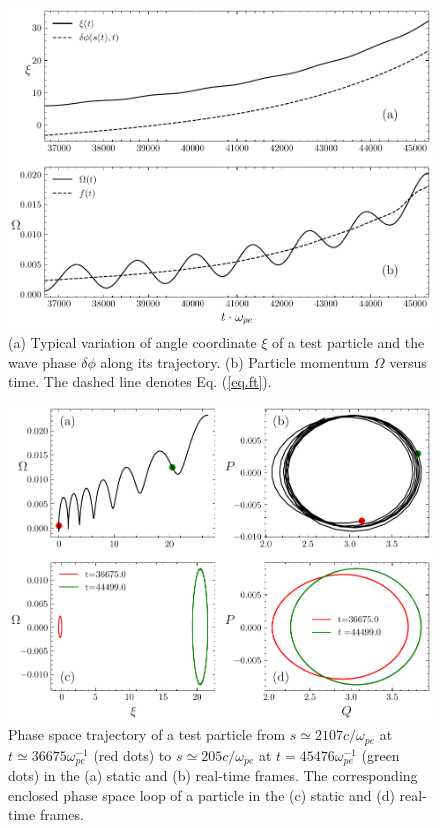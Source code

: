 \begin{figure}
    \centering
    \includegraphics[scale=0.5]{img/phaseflow.pdf}
    \caption{
    (a) Typical variation of angle coordinate $\xi$ of a test particle and the  wave phase $\delta \phi$ along its trajectory.  (b) Particle momentum $\Omega$ versus time. The dashed line denotes Eq. (\ref{eq.ft}).
    \label{fig.phaseflow}
    }
\end{figure}
\begin{figure}
    \centering
    \includegraphics[scale=0.5]{img/Trajectory.pdf}
    \caption{Phase space trajectory of a test particle from $s \simeq 2107 c/\omega_{pe}$ at $t\simeq 36675 \omega_{pe}^{-1}$ 
    (red dots)
     to $s \simeq 205 c/\omega_{pe}$ at $t=45476 \omega_{pe}^{-1}$ 
    (green dots)
      in the (a) static  and  (b) real-time frames.  The corresponding enclosed phase space loop of a particle in the (c)  static and  (d) real-time  frames. 
    \label{fig.traj} 
    }
\end{figure}

